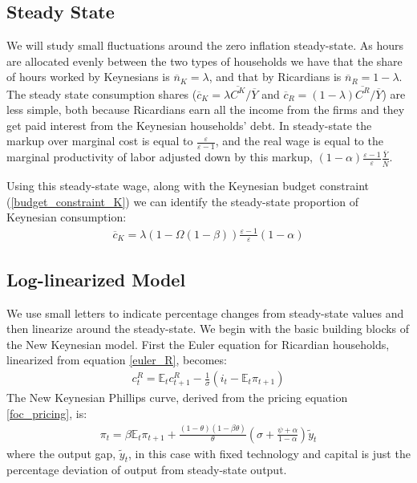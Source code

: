 \documentclass[12pt,a4paper]{article}
\begin{document}
\subsection{Steady State}
We will study small fluctuations around the zero inflation steady-state. As hours are allocated evenly between the two types of households we have that the share of hours worked by Keynesians is $\overline{n}_{K} = \lambda$, and that by Ricardians is $\overline{n}_{R} = 1-\lambda$. The steady state consumption shares ($\overline{c}_{K} = \lambda\overline{C^K}/\overline{Y}$ and $\overline{c}_{R} = (1-\lambda)\overline{C^R}/\overline{Y}$) are less simple, both because Ricardians earn all the income from the firms and they get paid interest from the Keynesian households' debt. In steady-state the markup over marginal cost is equal to $\frac{\varepsilon}{\varepsilon-1}$, and the real wage is equal to the marginal productivity of labor adjusted down by this markup, $(1-\alpha) \frac{\varepsilon-1}{\varepsilon}\frac{\overline{Y}}{\overline{N}}$. 

Using this steady-state wage, along with the Keynesian budget constraint (\ref{budget_constraint_K}) we can identify the steady-state proportion of Keynesian consumption:
\begin{align}
\overline{c}_{K} = \lambda \left(1-\Omega(1-\beta)\right)\frac{\varepsilon-1}{\varepsilon}(1-\alpha) \label{c_K_ss}
\end{align}

\subsection{Log-linearized Model}
We use small letters to indicate percentage changes from steady-state values and then linearize around the steady-state. We begin with the basic building blocks of the New Keynesian model. First the Euler equation for Ricardian households, linearized from equation \ref{euler_R}, becomes:
\begin{align}
c^R_t = \mathbb{E}_t c^R_{t+1} - \frac{1}{\sigma}(i_t - \mathbb{E}_t\pi_{t+1}) \label{euler_R_linear}
\end{align}
The New Keynesian Phillips curve, derived from the pricing equation \ref{foc_pricing}, is:
\begin{align}
\pi_t=\beta \mathbb{E}_t\pi_{t+1}+\frac{(1-\theta)(1-\beta\theta)}{\theta}\left(\sigma +  \frac{\psi + \alpha}{1-\alpha} \right)\tilde{y}_t \label{NKphillips_linear}
\end{align}
where the output gap, $\tilde{y}_t$, in this case with fixed technology and capital is just the percentage deviation of output from steady-state output.
\end{document}
